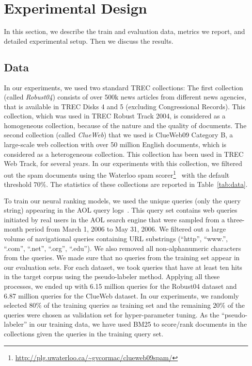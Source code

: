 \documentclass[sigconf]{acmart}
\newcommand{\sshrink}{\vspace{-.80ex}}
\begin{document}
\sshrink
\section{Experimental Design}
In this section, we describe the train and evaluation data, metrics we report, and detailed experimental setup. Then we discuss the results.


\sshrink
\subsection{Data}
\label{sec:data}
In our experiments, we used two standard TREC collections: The first collection (called \emph{Robust04}) consists of over 500k news articles from different news agencies, that is available in TREC Disks 4 and 5 (excluding Congressional Records). This collection, which was used in TREC Robust Track 2004, is considered as a homogeneous collection, because of the nature and the quality of documents. The second collection (called \emph{ClueWeb}) that we used is ClueWeb09 Category B, a large-scale web collection with over 50 million English documents, which is considered as a heterogeneous collection. This collection has been used in TREC Web Track, for several years. In our experiments with this collection, we filtered out the spam documents using the Waterloo spam scorer\footnote{\url{http://plg.uwaterloo.ca/~gvcormac/clueweb09spam/}}~\citep{Cormack:2011} with the default threshold $70\%$. The statistics of these collections are reported in Table~\ref{tab:data}. 

To train our neural ranking models, we used the unique queries (only the query string) appearing in the AOL query logs~\citep{Pass:2006}. This query set contains web queries initiated by real users in the AOL search engine that were sampled from a three-month period from March 1, 2006 to May 31, 2006. We filtered out a large volume of navigational queries containing URL substrings (``http'', ``www.'', ``.com'', ``.net'', ``.org'', ``.edu''). We also removed all non-alphanumeric characters from the queries. We made sure that no queries from the training set appear in our evaluation sets. For each dataset, we took queries that have at least ten hits in the target corpus using the pseudo-labeler method. Applying all these processes, we ended up with 6.15 million queries for the Robust04 dataset and 6.87 million queries for the ClueWeb dataset. 
In our experiments, we randomly selected $80\%$ of the training queries as training set and the remaining $20\%$ of the queries were chosen as validation set for hyper-parameter tuning. As the ``pseudo-labeler'' in our training data, we have used BM25 to score/rank documents in the collections given the queries in the training query set.
\end{document}
